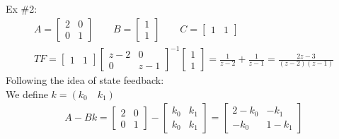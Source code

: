 \documentclass[a4paper,11pt]{article}
\begin{document}
	Ex \#2:
	\begin{gather}
			A= 
			\begin{bmatrix}
				2 & 0 \\
				0 & 1 
			\end{bmatrix}
			\qquad 
			B = 
			\begin{bmatrix}
				1 \\ 1 
			\end{bmatrix}
			\qquad 
			C = 	
			\begin{bmatrix}
				1 & 1
			\end{bmatrix}\\
			TF = 			
			\begin{bmatrix}
				1 & 1
			\end{bmatrix}
			\begin{bmatrix}
				z-2 & 0 \\
				0 & z-1 
			\end{bmatrix}^{-1}
			\begin{bmatrix}
				1 \\ 1 
			\end{bmatrix}
			= \frac{1}{z-2}+\frac{1}{z-1}=\frac{2z-3}{(z-2)(z-1)}
		\end{gather}	 
		Following the idea of state feedback:\\
		We define $k=(k_0\quad k_1)$
		\begin{gather}
			A-Bk = 
			\begin{bmatrix}
				2& 0\\
				0&1
			\end{bmatrix}-
			\begin{bmatrix}
				k_0& k_1\\
				k_0& k_1
			\end{bmatrix}=
			\begin{bmatrix}
				2-k_0 & -k_1\\
				-k_0 & 1-k_1
			\end{bmatrix}
		\end{gather}
\end{document}
